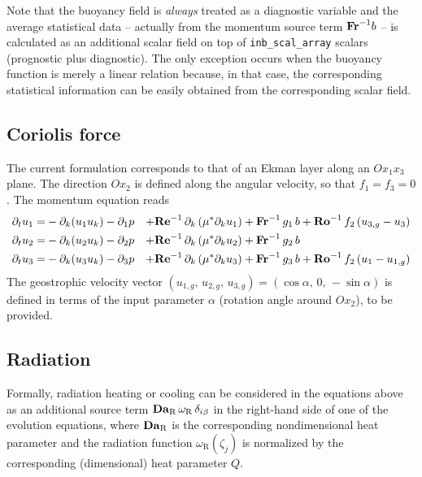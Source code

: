 Note that the buoyancy field is {\it always} treated as a diagnostic variable and the average statistical data -- actually from the momentum source term $\mathrm{\bf Fr}^{-1}b$ -- is calculated as an additional scalar field on top of {\tt   inb\_scal\_array} scalars (prognostic plus diagnostic). The only exception occurs when the buoyancy function is merely a linear relation because, in that case, the corresponding statistical information can be easily obtained from the corresponding scalar field.

\subsection{Coriolis force}

The current formulation corresponds to that of an Ekman layer along an $Ox_1x_3$ plane. The direction $Ox_2$ is defined along the angular velocity, so that $f_1=f_3=0$. The momentum equation reads 
\begin{subequations}
    \begin{align}
        \partial_t  u_1 =& -\partial_k ( u_1 u_k ) -\partial_1 p &
        +\mathrm{\bf Re}^{-1}\,\partial_k  \left( \mu^{*} \partial_k u_1\right) &
        +\mathrm{\bf Fr}^{-1}\, g_1\,b +\mathrm{\bf Ro}^{-1}\,f_2\,(u_{3,g}-u_3) \\
        \partial_t  u_2 =& -\partial_k ( u_2 u_k ) -\partial_2 p &
        +\mathrm{\bf Re}^{-1}\,\partial_k  \left( \mu^{*} \partial_k u_2\right) &
        +\mathrm{\bf Fr}^{-1}\, g_2\,b \\
        \partial_t  u_3 =& -\partial_k ( u_3 u_k ) -\partial_3 p &
        +\mathrm{\bf Re}^{-1}\,\partial_k  \left( \mu^{*} \partial_k u_3\right) &
        +\mathrm{\bf Fr}^{-1}\, g_3\,b +\mathrm{\bf Ro}^{-1}\,f_2\,(u_1-u_{1,g})
    \end{align}
\end{subequations}
The geostrophic velocity vector $(u_{1,g},\,u_{2,g},\,u_{3,g}) = (\cos\alpha,\,0,\,-\sin\alpha)$ is defined in terms of the input parameter $\alpha$ (rotation angle around $Ox_2$), to be provided.

\subsection{Radiation}

Formally, radiation heating or cooling can be considered in the equations above as an additional source term $\mathrm{\bf Da}_\mathrm{R}\,\omega_\mathrm{R}\,\delta_{i\beta}$ in the right-hand side of one of the evolution equations, where $\mathrm{\bf Da}_\mathrm{R}$ is the corresponding nondimensional heat parameter and the radiation function $\omega_\mathrm{R}(\zeta_j)$ is normalized by the corresponding (dimensional) heat parameter $Q$. 

